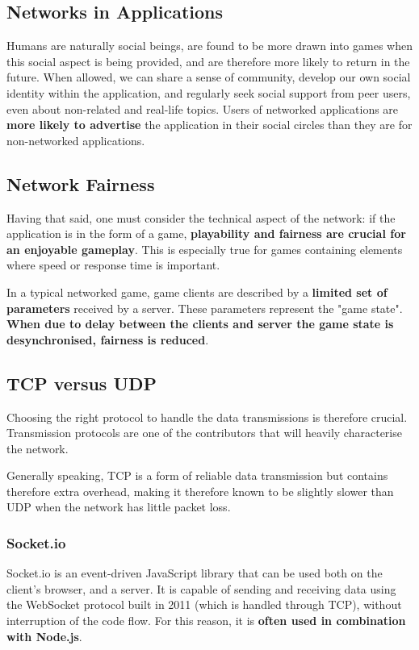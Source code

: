 \documentclass[bsc,frontabs,twoside,singlespacing,parskip,deptreport]{infthesis}     %
\begin{document}
\subsection{Networks in Applications}
Humans are naturally social beings, are found to be more drawn into games when this social aspect is being provided, and are therefore more likely to return in the future\cite{Browser_Games}. When allowed, we can share a sense of community, develop our own social identity within the application, and regularly seek social support from peer users, even about non-related and real-life topics\cite{Community_Social_Psychology}. Users of networked applications are \textbf{more likely to advertise} the application in their social circles than they are for non-networked applications.

\subsection{Network Fairness}
Having that said, one must consider the technical aspect of the network: if the application is in the form of a game, \textbf{playability and fairness are crucial for an enjoyable gameplay}. This is especially true for games containing elements where speed or response time is important.

In a typical networked game, game clients are described by a \textbf{limited set of parameters} received by a server. These parameters represent the "game state". \textbf{When due to delay between the clients and server the game state is desynchronised, fairness is reduced}\cite{Fairness_and_Playability}.

\subsection{TCP versus UDP}
Choosing the right protocol to handle the data transmissions is therefore crucial. Transmission protocols are one of the contributors that will heavily characterise the network.
 
Generally speaking, TCP is a form of reliable data transmission but contains therefore extra overhead, making it therefore known to be slightly slower than UDP when the network has little packet loss.

\subsubsection{Socket.io}
Socket.io is an event-driven JavaScript library that can be used both on the client's browser, and a server\cite{Socketio}. It is capable of sending and receiving data using the WebSocket protocol built in 2011 (which is handled through TCP), without interruption of the code flow\cite{Socketio_Benchmark}\cite{Socketio_TCP_Benchmark}. For this reason, it is \textbf{often used in combination with Node.js}.
\end{document}
